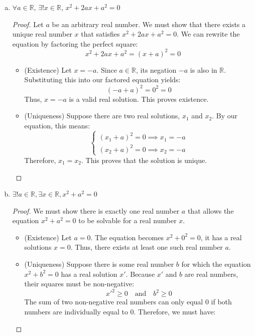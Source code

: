 \begin{solutions*}
    \fixlistskip
    \begin{enumerate}[(a)]
    \item $\forall a \in \mathbb{R},\, \exists! x \in \mathbb{R},\, x^2 + 2ax + a^2 = 0$
    \begin{proof}
        Let $a$ be an arbitrary real number. We must show that there exists a unique real number $x$ that satisfies $x^2 + 2ax + a^2 = 0$. We can rewrite the equation by factoring the perfect square:
        \[x^2 + 2ax + a^2 = (x+a)^2 = 0\]
        \begin{itemize}
            \item (Existence) Let $x = -a$. Since $a \in \mathbb{R}$, its negation $-a$ is also in $\mathbb{R}$. Substituting this into our factored equation yields:
            \[(-a + a)^2 = 0^2 = 0\]
            Thus, $x = -a$ is a valid real solution. This proves existence.
            \item (Uniqueness) Suppose there are two real solutions, $x_1$ and $x_2$. By our equation, this means:
            \[\begin{cases}
                (x_1 + a)^2 = 0 \implies x_1 = -a\\
                (x_2 + a)^2 = 0 \implies x_2 = -a
            \end{cases}\]
            Therefore, $x_1 = x_2$. This proves that the solution is unique.
        \end{itemize}
    \end{proof}
    \item $\exists! a \in \mathbb{R}, \exists x \in \mathbb{R}, x^2 + a^2 = 0$
    \begin{proof}
        We must show there is exactly one real number $a$ that allows the equation $x^2 + a^2 = 0$ to be solvable for a real number $x$.
        \begin{itemize}
            \item (Existence) Let $a = 0$. The equation becomes $x^2 + 0^2 = 0$, it has a real solutions $x = 0$. Thus, there exists at least one such real number $a$.
            \item (Uniqueness) Suppose there is some real number $b$ for which the equation $x^2 + b^2 = 0$ has a real solution $x'$. Because $x'$ and $b$ are real numbers, their squares must be non-negative:
            \[x'^2 \ge 0 \quad \text{and} \quad b^2 \ge 0\]
            The sum of two non-negative real numbers can only equal $0$ if both numbers are individually equal to $0$. Therefore, we must have:

\end{itemize}
\end{proof}
\end{enumerate}
\end{solutions*}
